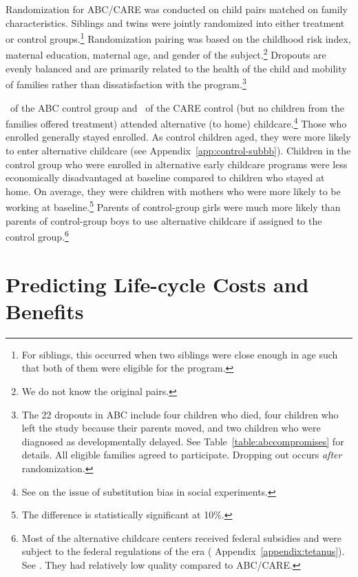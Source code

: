 Randomization for ABC/CARE was conducted on child pairs matched on family characteristics. Siblings and twins were jointly randomized into either treatment or control groups.\footnote{For siblings, this occurred when two siblings were close enough in age such that both of them were eligible for the program.} Randomization pairing was based on the childhood risk index, maternal education, maternal age, and gender of the subject.\footnote{We do not know the original pairs.} Dropouts are evenly balanced and are primarily related to the health of the child and mobility of families rather than dissatisfaction with the program.\footnote{The 22 dropouts in ABC include four children who died, four children who left the study because their parents moved, and two children who were diagnosed as developmentally delayed. See Table~\ref{table:abccompromises} for details. All eligible families agreed to participate. Dropping out occurs \emph{after} randomization.}

\treatsubsabc\ of the ABC control group and \treatsubscarec\ of the CARE control (but no children from the families offered treatment) attended alternative (to home) childcare.\footnote{See \cite{Heckman_Hohmann_etal_2000_QJE} on the issue of substitution bias in social experiments.} Those who enrolled generally stayed enrolled. As control children aged, they were more likely to enter alternative childcare (see  Appendix~\ref{app:control-subbb}). Children in the control group who were enrolled in alternative early childcare programs were less economically disadvantaged at baseline compared to children who stayed at home. On average, they were children with mothers who were more likely to be working at baseline.\footnote{The difference is statistically significant at 10\%.} Parents of control-group girls were much more likely than parents of control-group boys to use alternative childcare if assigned to the control group.\footnote{Most of the alternative childcare centers received federal subsidies and were subject to the federal regulations of the era ( Appendix~\ref{appendix:tetanus}). See \citet{Department-of-Health_1968_DayCareRequirements,NCGA_1971_House-Bill-100,Ramey-et-al_1977_Intro-to-ABC,Ramey_Campbell_1979_SR,Ramey_McGinness_etal_1982_Abecedarianapproach, Burchinal_Campbell_etal_1997_CD}. They had relatively low quality compared to ABC/CARE.}

\section{Predicting Life-cycle Costs and Benefits}\label{section:cbamethodology}

